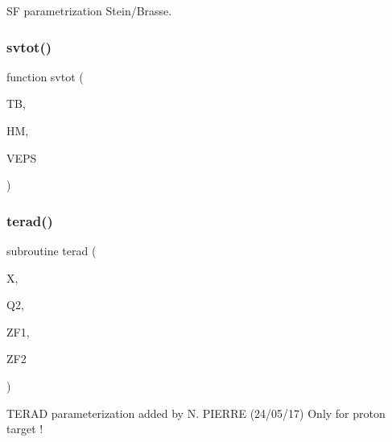 SF parametrization Stein/\+Brasse. 

\mbox{\label{djangoh__h_8f_a09c6d9f465f6389f731d46e6f94caae9}} 
\subsubsection{\texorpdfstring{svtot()}{svtot()}}
{\footnotesize\ttfamily function svtot (\begin{DoxyParamCaption}\item[{}]{TB,  }\item[{}]{HM,  }\item[{}]{V\+E\+PS }\end{DoxyParamCaption})}

\mbox{\label{djangoh__h_8f_a8b060a39c51e672f84e910a6e0554b14}} 
\subsubsection{\texorpdfstring{terad()}{terad()}}
{\footnotesize\ttfamily subroutine terad (\begin{DoxyParamCaption}\item[{}]{X,  }\item[{}]{Q2,  }\item[{}]{Z\+F1,  }\item[{}]{Z\+F2 }\end{DoxyParamCaption})}



T\+E\+R\+AD parameterization added by N. P\+I\+E\+R\+RE (24/05/17) Only for proton target ! 

\mbox{\label{djangoh__h_8f_a750c00ba56a362780036ea85c5cac118}} 
